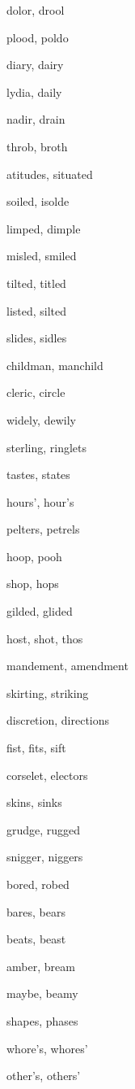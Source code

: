     \item dolor, drool
    \item plood, poldo
    \item diary, dairy
    \item lydia, daily
    \item nadir, drain
    \item throb, broth
    \item atitudes, situated
    \item soiled, isolde
    \item limped, dimple
    \item misled, smiled
    \item tilted, titled
    \item listed, silted
    \item slides, sidles
    \item childman, manchild
    \item cleric, circle
    \item widely, dewily
    \item sterling, ringlets
    \item tastes, states
    \item hours', hour's
    \item pelters, petrels
    \item hoop, pooh
    \item shop, hops
    \item gilded, glided
    \item host, shot, thos
    \item mandement, amendment
    \item skirting, striking
    \item discretion, directions
    \item fist, fits, sift
    \item corselet, electors
    \item skins, sinks
    \item grudge, rugged
    \item snigger, niggers
    \item bored, robed
    \item bares, bears
    \item beats, beast
    \item amber, bream
    \item maybe, beamy
    \item shapes, phases
    \item whore's, whores'
    \item other's, others'
